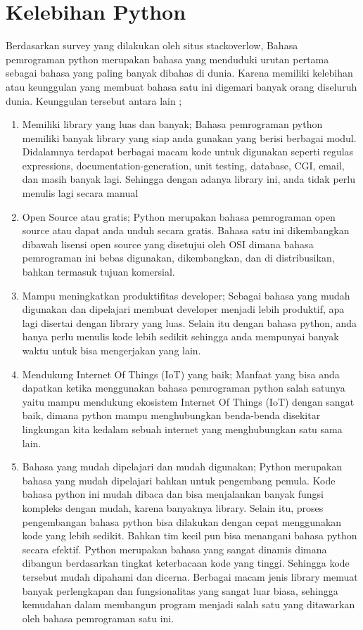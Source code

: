 \section{Kelebihan Python}
Berdasarkan survey yang dilakukan oleh situs stackoverlow, Bahasa pemrograman python merupakan bahasa yang menduduki urutan pertama sebagai bahasa yang paling banyak dibahas di dunia. Karena memiliki kelebihan atau keunggulan yang membuat bahasa satu ini digemari banyak orang diseluruh dunia. Keunggulan tersebut antara lain ;
\begin{enumerate}
\item Memiliki library yang luas dan banyak; Bahasa pemrograman python memiliki banyak library yang siap anda gunakan yang berisi berbagai modul. Didalamnya terdapat berbagai macam kode untuk digunakan seperti regulas expressions, documentation-generation, unit testing, database, CGI, email, dan masih banyak lagi. Sehingga dengan adanya library ini, anda tidak perlu menulis lagi secara manual
\item Open Source atau gratis; Python merupakan bahasa pemrograman open source atau dapat anda unduh secara gratis. Bahasa satu ini dikembangkan dibawah lisensi open source yang disetujui oleh OSI dimana bahasa pemrograman ini bebas digunakan, dikembangkan, dan di distribusikan, bahkan termasuk tujuan komersial.
\item Mampu meningkatkan produktifitas developer; Sebagai bahasa yang mudah digunakan dan dipelajari membuat developer menjadi lebih produktif, apa lagi disertai dengan library yang luas. Selain itu dengan bahasa python, anda hanya perlu menulis kode lebih sedikit sehingga anda mempunyai banyak waktu untuk bisa mengerjakan yang lain.
\item Mendukung Internet Of Things (IoT) yang baik; Manfaat yang bisa anda dapatkan ketika menggunakan bahasa pemrograman python salah satunya yaitu mampu mendukung ekosistem Internet Of Things (IoT) dengan sangat baik, dimana python mampu menghubungkan benda-benda disekitar lingkungan kita kedalam sebuah internet yang menghubungkan satu sama lain.
\item Bahasa yang mudah dipelajari dan mudah digunakan; Python merupakan bahasa yang mudah dipelajari bahkan untuk pengembang pemula. Kode bahasa python ini mudah dibaca dan bisa menjalankan banyak fungsi kompleks dengan mudah, karena banyaknya library. Selain itu, proses pengembangan bahasa python bisa dilakukan dengan cepat menggunakan kode yang lebih sedikit. Bahkan tim kecil pun bisa menangani bahasa python secara efektif. Python merupakan bahasa yang sangat dinamis dimana dibangun berdasarkan tingkat keterbacaan kode yang tinggi. Sehingga kode tersebut mudah dipahami dan dicerna. Berbagai macam jenis library memuat banyak perlengkapan dan fungsionalitas yang sangat luar biasa, sehingga kemudahan dalam membangun program menjadi salah satu yang ditawarkan oleh bahasa pemrograman satu ini.

\end{enumerate}
